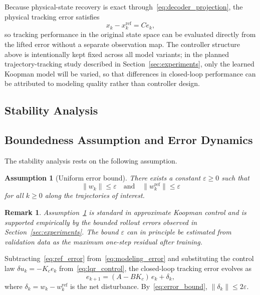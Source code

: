 \documentclass[journal]{IEEEtran}
\newtheorem{assumption}{Assumption}
\newtheorem{remark}{Remark}
\begin{document}
Because physical-state recovery is exact through~\eqref{eq:decoder_projection}, the physical tracking error satisfies
\begin{equation}
    x_k - x_k^{\mathrm{ref}} = C e_k,
\end{equation}
so tracking performance in the original state space can be evaluated directly from the lifted error without a separate observation map. The controller structure above is intentionally kept fixed across all model variants; in the planned trajectory-tracking study described in Section~\ref{sec:experiments}, only the learned Koopman model will be varied, so that differences in closed-loop performance can be attributed to modeling quality rather than controller design.

\subsection{Stability Analysis}

\subsection{Boundedness Assumption and Error Dynamics}

The stability analysis rests on the following assumption.

\begin{assumption}[Uniform error bound]
\label{assump:bound}
There exists a constant $\varepsilon \geq 0$ such that
\begin{equation}
    \|w_k\| \leq \varepsilon \quad \text{and} \quad \|w_k^{\mathrm{ref}}\| \leq \varepsilon
    \label{eq:error_bound}
\end{equation}
for all $k \geq 0$ along the trajectories of interest.
\end{assumption}

\begin{remark}
Assumption~\ref{assump:bound} is standard in approximate Koopman control \cite{strasser2026overview} and is supported empirically by the bounded rollout errors observed in Section~\ref{sec:experiments}. The bound $\varepsilon$ can in principle be estimated from validation data as the maximum one-step residual after training.
\end{remark}

Subtracting~\eqref{eq:ref_error} from~\eqref{eq:modeling_error} and substituting the control law $\delta u_k = -K_c e_k$ from~\eqref{eq:lqr_control}, the closed-loop tracking error evolves as
\begin{equation}
    e_{k+1} = (A - BK_c)\,e_k + \delta_k,
    \label{eq:error_dynamics}
\end{equation}
where $\delta_k = w_k - w_k^{\mathrm{ref}}$ is the net disturbance. By~\eqref{eq:error_bound}, $\|\delta_k\| \leq 2\varepsilon$.
\end{document}
